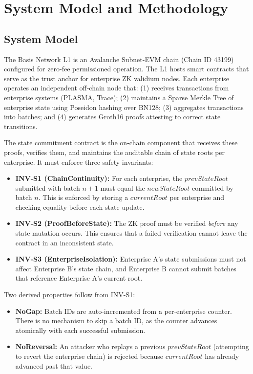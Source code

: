 \section{System Model and Methodology}
\label{sec:methodology}

\subsection{System Model}

The Basis Network L1 is an Avalanche Subnet-EVM chain (Chain ID 43199) configured for
zero-fee permissioned operation. The L1 hosts smart contracts that serve as the trust
anchor for enterprise ZK validium nodes. Each enterprise operates an independent off-chain
node that: (1) receives transactions from enterprise systems (PLASMA, Trace); (2) maintains
a Sparse Merkle Tree of enterprise state using Poseidon hashing over BN128; (3) aggregates
transactions into batches; and (4) generates Groth16 proofs attesting to correct state
transitions.

The state commitment contract is the on-chain component that receives these proofs, verifies
them, and maintains the auditable chain of state roots per enterprise. It must enforce three
safety invariants:

\begin{itemize}
\item \textbf{INV-S1 (ChainContinuity):} For each enterprise, the $\mathit{prevStateRoot}$
submitted with batch $n+1$ must equal the $\mathit{newStateRoot}$ committed by batch $n$.
This is enforced by storing a $\mathit{currentRoot}$ per enterprise and checking equality
before each state update.
\item \textbf{INV-S2 (ProofBeforeState):} The ZK proof must be verified \emph{before} any
state mutation occurs. This ensures that a failed verification cannot leave the contract in
an inconsistent state.
\item \textbf{INV-S3 (EnterpriseIsolation):} Enterprise A's state submissions must not
affect Enterprise B's state chain, and Enterprise B cannot submit batches that reference
Enterprise A's current root.
\end{itemize}

\noindent Two derived properties follow from INV-S1:

\begin{itemize}
\item \textbf{NoGap:} Batch IDs are auto-incremented from a per-enterprise counter. There
is no mechanism to skip a batch ID, as the counter advances atomically with each
successful submission.
\item \textbf{NoReversal:} An attacker who replays a previous $\mathit{prevStateRoot}$
(attempting to revert the enterprise chain) is rejected because $\mathit{currentRoot}$ has
already advanced past that value.
\end{itemize}

